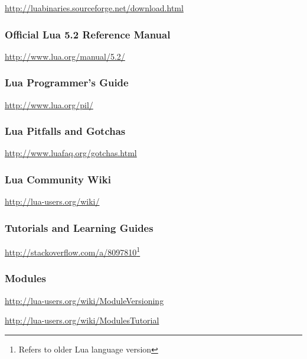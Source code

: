\url{http://luabinaries.sourceforge.net/download.html}

\subsubsection{Official Lua 5.2 Reference Manual}

\url{http://www.lua.org/manual/5.2/}

\subsubsection{Lua Programmer's Guide}

\url{http://www.lua.org/pil/}

\subsubsection{Lua Pitfalls and Gotchas}

\url{http://www.luafaq.org/gotchas.html}

\subsubsection{Lua Community Wiki}

\url{http://lua-users.org/wiki/}

\subsubsection{Tutorials and Learning Guides}

\url{http://stackoverflow.com/a/8097810}\footnote{Refers to older Lua language
version}

\subsubsection{Modules}

\url{http://lua-users.org/wiki/ModuleVersioning}

\url{http://lua-users.org/wiki/ModulesTutorial}


